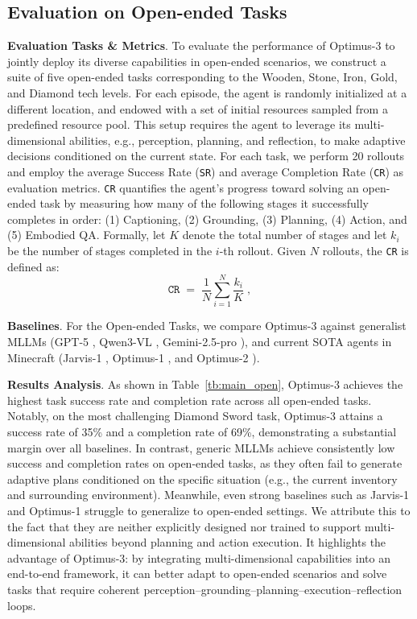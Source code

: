 \subsection{Evaluation on Open-ended Tasks}

\noindent\textbf{Evaluation Tasks \& Metrics}. To evaluate the performance of Optimus-3 to jointly deploy its diverse capabilities in open-ended scenarios, we construct a suite of five open-ended tasks corresponding to the Wooden, Stone, Iron, Gold, and Diamond tech levels. For each episode, the agent is randomly initialized at a different location, and endowed with a set of initial resources sampled from a predefined resource pool. This setup requires the agent to leverage its multi-dimensional abilities, e.g.,  perception, planning, and reflection, to make adaptive decisions conditioned on the current state. For each task, we perform 20 rollouts and employ the average Success Rate (\texttt{SR}) and average Completion Rate (\texttt{CR}) as evaluation metrics. 
\texttt{CR} quantifies the agent's progress toward solving an open-ended task by measuring how many of the following stages it successfully completes in order: (1) Captioning, (2) Grounding, (3) Planning, (4) Action, and (5) Embodied QA. Formally, let $K$ denote the total number of stages and let $k_i$ be the number of stages completed in the $i$-th rollout. Given $N$ rollouts, the \texttt{CR} is defined as:
\begin{equation}
\texttt{CR} \;=\; \frac{1}{N}\sum_{i=1}^{N} \frac{k_i}{K}\;,
\end{equation}

\noindent\textbf{Baselines}. For the Open-ended Tasks, we compare Optimus-3 against generalist MLLMs (GPT-5 \cite{gpt4}, Qwen3-VL \cite{bai2025qwen2}, Gemini-2.5-pro \cite{team2024gemini}), and current SOTA agents in Minecraft (Jarvis-1 \cite{wang2023jarvis}, Optimus-1 \cite{li2024optimus}, and Optimus-2 \cite{li2025optimus}).


\noindent\textbf{Results Analysis}. As shown in Table~\ref{tb:main_open}, Optimus-3 achieves the highest task success rate and completion rate across all open-ended tasks. Notably, on the most challenging Diamond Sword task, Optimus-3 attains a success rate of 35\% and a completion rate of 69\%, demonstrating a substantial margin over all baselines. In contrast, generic MLLMs achieve consistently low success and completion rates on open-ended tasks, as they often fail to generate adaptive plans conditioned on the specific situation (e.g., the current inventory and surrounding environment). Meanwhile, even strong baselines such as Jarvis-1 \cite{wang2023jarvis} and Optimus-1 \cite{li2024optimus} struggle to generalize to open-ended settings. We attribute this to the fact that they are neither explicitly designed nor trained to support multi-dimensional abilities beyond planning and action execution. It highlights the advantage of Optimus-3: by integrating multi-dimensional capabilities into an end-to-end framework, it can better adapt to open-ended scenarios and solve tasks that require coherent perception--grounding--planning--execution--reflection loops.


